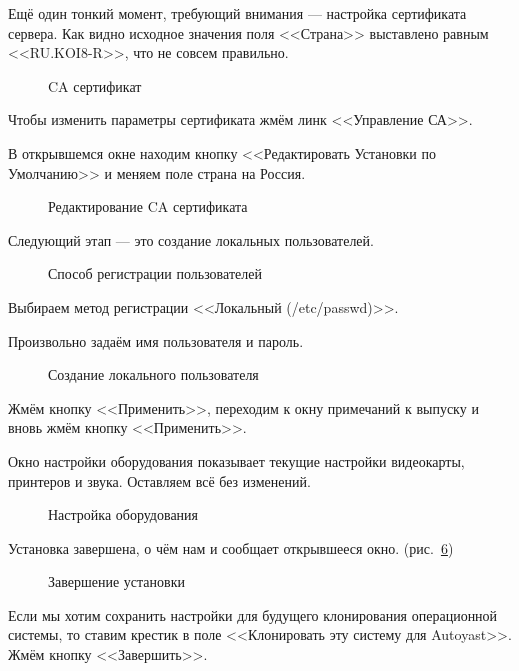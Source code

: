 Ещё один тонкий момент, требующий внимания — настройка сертификата сервера. Как видно исходное значения поля <<Страна>> выставлено равным <<RU.KOI8-R>>, что не совсем правильно. 
\begin{figure}[H]
\caption{CA сертификат}
\label{sertificate}
\end{figure}
Чтобы изменить параметры сертификата жмём линк <<Управление СА>>. 
\clearpage

В открывшемся окне находим кнопку <<Редактировать Установки по Умолчанию>> и меняем поле страна на Россия.
\begin{figure}[H]
\caption{Редактирование CA сертификата}
\label{fig11}
\end{figure}
\clearpage

Следующий этап --- это создание локальных пользователей.
\begin{figure}[H]
\caption{Способ регистрации пользователей}
\label{fig12}
\end{figure}
Выбираем метод регистрации <<Локальный (/etc/passwd)>>.
\clearpage

Произвольно задаём имя пользователя и пароль.
\begin{figure}[H]
\caption{Создание локального пользователя}
\label{fig13}
\end{figure}
Жмём кнопку <<Применить>>, переходим к окну примечаний к выпуску и вновь жмём кнопку <<Применить>>.
\clearpage

Окно настройки оборудования показывает текущие настройки видеокарты, принтеров и звука. Оставляем всё без изменений.
\begin{figure}[H]
\caption{Настройка оборудования}
\label{fig14}
\end{figure}
\clearpage

Установка завершена, о чём нам и сообщает открывшееся окно. (рис.~\ref{fig15})
\begin{figure}[H]
\caption{Завершение установки}
\label{fig15}
\end{figure}
Если мы хотим сохранить настройки для будущего клонирования операционной
системы, то ставим крестик в поле <<Клонировать эту систему для Autoyast>>. Жмём кнопку <<Завершить>>.
\clearpage

